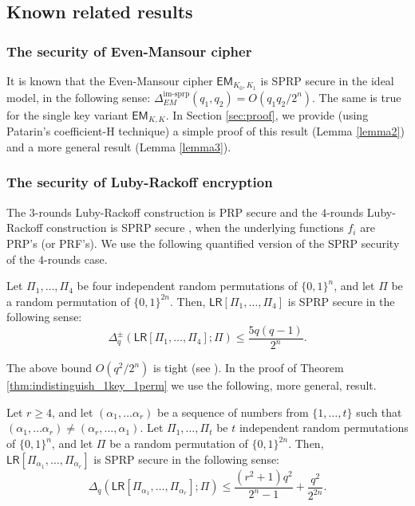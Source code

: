 \documentclass{llncs}
\newcommand{\s}{\{0,1\}}
\newcommand{\tx}{\textsf}
\begin{document}
\subsection{Known related results}\label{subsection3_2}

\subsubsection{The security of Even-Mansour cipher} 
It is known that the Even-Mansour cipher $\tx{EM}_{K_0, K_1}$ is SPRP secure in the ideal model, in the following sense:  $\Delta_{EM}^{\mathrm{im\textit{-}sprp}}(q_1, q_2) = O(q_1 q_2/2^n)$. The same is true for the single key variant $\tx{EM}_{K, K}$.
In Section \ref{sec:proof}, we provide (using Patarin's coefficient-H technique) a simple proof of this result (Lemma \ref{lemma2}) and a more general result (Lemma \ref{lemma3}).

\subsubsection{The security of Luby-Rackoff encryption}
The $3$-rounds Luby-Rackoff construction is PRP secure and the $4$-rounds Luby-Rackoff construction is SPRP secure ,
when the underlying functions $f_i$ are PRP's (or PRF's).
We use the following quantified version of the SPRP security of the $4$-rounds case.
\begin{theorem}
\label{Piret}
Let $\Pi_1, \ldots, \Pi_4$ be four independent random permutations of
$\s^n$, and let $\Pi$ be a random permutation of $\s^{2n}$.
Then, $\tx{LR}[\Pi_1, \ldots, \Pi_4]$ is SPRP  secure in the following sense:
\[\Delta^{\pm}_{q}(\tx{LR}[\Pi_1, \ldots, \Pi_4];\Pi) \leq \frac{5q (q-1)}{2^n}.\]
\end{theorem}

The above bound $O(q^2/2^n)$ is tight (see \cite{TP}).
In the proof of Theorem \ref{thm:indistinguish_1key_1perm} we use the following, more general, result.
\begin{theorem}
\label{Nandi}
Let $ r \geq 4$, and let $(\alpha_1, \ldots \alpha_r)$  be a sequence of numbers from $\{1,\ldots, t\}$ such that $(\alpha_1, \ldots \alpha_r) \neq (\alpha_{r}, \ldots, \alpha_1)$. Let $\Pi_1, \ldots, \Pi_t$ be $t$ independent random permutations of $\s^n$, and let $\Pi$ be a random permutation of $\s^{2n}$. Then, $\tx{LR}[\Pi_{\alpha_1}, \ldots, \Pi_{\alpha_r}]$ is  SPRP  secure in the following sense:
\[\Delta_{q}(\tx{LR}[\Pi_{\alpha_1}, \ldots, \Pi_{\alpha_r}];\Pi) \leq \frac{(r^2+1)q^2}{2^n-1} + \frac{q^2}{2^{2n}}.\]
\end{theorem}
\end{document}

